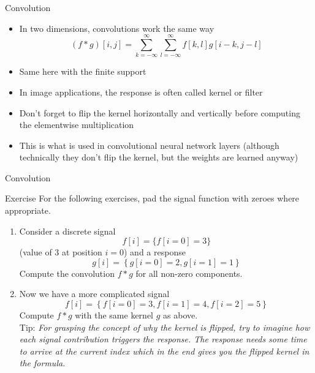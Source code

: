   \begin{frame}{Convolution}
    \begin{itemize}
      \item In two dimensions, convolutions work the same way
        \begin{equation*}
          (f*g)[i, j] =
          \sum_{k=-\infty}^{\infty} \sum_{l=-\infty}^{\infty} f[k,l]g[i-k, j-l]
        \end{equation*}
      \item Same here with the finite support
      \item In image applications, the response is often called kernel or filter
      \item Don't forget to flip the kernel horizontally and vertically before
        computing the elementwise multiplication
      \item This is what is used in convolutional neural network layers (although
        technically they don't flip the kernel, but the weights are learned anyway)
    \end{itemize}
  \end{frame}

  \begin{frame}{Convolution}
    \begin{exampleblock}{Exercise}
    For the following exercises, pad the signal function with zeroes where
    appropriate.
      \begin{enumerate}
        \item Consider a discrete signal
          \begin{equation*}
            f[i] = \{f[i=0] = 3 \}
          \end{equation*}
          (value of $3$ at position $i=0$) and a response
          \begin{equation*}
            g[i] = \left\{g[i=0] = 2, g[i=1] = 1\right\}
          \end{equation*}
          Compute the convolution $f*g$ for all non-zero components.
        \item Now we have a more complicated signal
          \begin{equation*}
            f[i] = \left\{f[i=0] = 3, f[i=1] = 4, f[i=2] = 5\right\}
          \end{equation*}
          Compute $f*g$ with the same kernel $g$ as above. \\
          {\footnotesize Tip: \emph{For grasping the concept of why the kernel is flipped, try
          to imagine how each signal contribution triggers the response. The
          response needs some time to arrive at the current index which in the
          end gives you the flipped kernel in the formula.}}
      \end{enumerate}
    \end{exampleblock}
  \end{frame}

